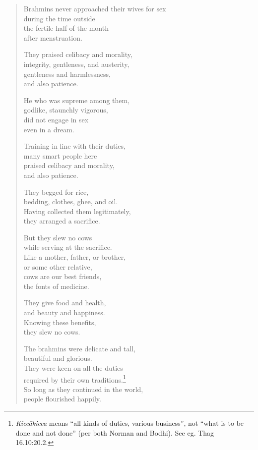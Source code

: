 \documentclass[12pt,openany]{book}%
\begin{document}
\begin{verse}
Brahmins never approached their wives for sex \\
during the time outside \\
the fertile half of the month \\
after menstruation. 

They praised celibacy and morality, \\
integrity, gentleness, and austerity, \\
gentleness and harmlessness, \\
and also patience. 

He who was supreme among them, \\
godlike, staunchly vigorous, \\
did not engage in sex \\
even in a dream. 

Training in line with their duties, \\
many smart people here \\
praised celibacy and morality, \\
and also patience. 

They begged for rice, \\
bedding, clothes, ghee, and oil. \\
Having collected them legitimately, \\
they arranged a sacrifice. 

But they slew no cows \\
while serving at the sacrifice. \\
Like a mother, father, or brother, \\
or some other relative, \\
cows are our best friends, \\
the fonts of medicine. 

They give food and health, \\
and beauty and happiness. \\
Knowing these benefits, \\
they slew no cows. 

The brahmins were delicate and tall, \\
beautiful and glorious. \\
They were keen on all the duties \\
required by their own traditions.\footnote{\textit{\textsanskrit{Kiccākicca}} means “all kinds of duties, various business”, not “what is to be done and not done” (per both Norman and Bodhi). See eg. Thag 16.10:20.2. } \\
So long as they continued in the world, \\
people flourished happily. 


\end{verse}
\end{document}
